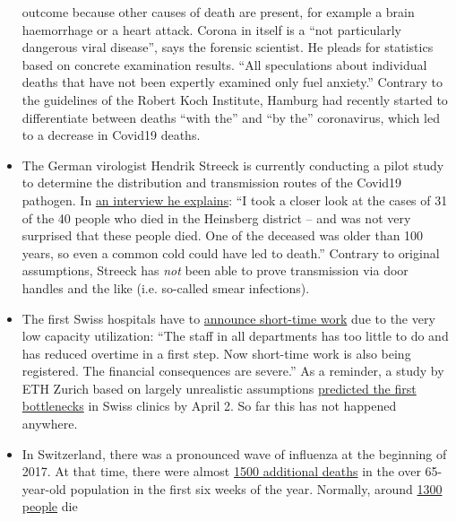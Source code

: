 \begin{itemize}
  outcome because other causes of death are present, for example a brain
  haemorrhage or a heart attack. Corona in itself is a ``not
  particularly dangerous viral disease'', says the forensic scientist.
  He pleads for statistics based on concrete examination results. ``All
  speculations about individual deaths that have not been expertly
  examined only fuel anxiety.'' Contrary to the guidelines of the Robert
  Koch Institute, Hamburg had recently started to differentiate between
  deaths ``with the'' and ``by the'' coronavirus, which led to a
  decrease in Covid19 deaths.
\item
  The German virologist Hendrik Streeck is currently conducting a pilot
  study to determine the distribution and transmission routes of the
  Covid19 pathogen. In
  \href{https://www.zeit.de/wissen/gesundheit/2020-04/hendrik-streeck-covid-19-heinsberg-symptome-infektionsschutz-massnahmen-studie/komplettansicht}{an
  interview he explains}: ``I took a closer look at the cases of 31 of
  the 40 people who died in the Heinsberg district -- and was not very
  surprised that these people died. One of the deceased was older than
  100 years, so even a common cold could have led to death.'' Contrary
  to original assumptions, Streeck has \emph{not} been able to prove
  transmission via door handles and the like (i.e. so-called smear
  infections).
\item
  The first Swiss hospitals have to
  \href{https://www.engadinerpost.ch/2020/4/04/Engadiner-Spitaeler-haben-freie-Kapazitaeten}{announce
  short-time work} due to the very low capacity utilization: ``The staff
  in all departments has too little to do and has reduced overtime in a
  first step. Now short-time work is also being registered. The
  financial consequences are severe.'' As a reminder, a study by ETH
  Zurich based on largely unrealistic assumptions
  \href{https://www.toponline.ch/news/coronavirus/detail/news/studie-bestaetigt-engpass-bei-spitalbetten-steht-kurz-bevor-00131333/}{predicted
  the first bottlenecks} in Swiss clinics by April 2. So far this has
  not happened anywhere.
\item
  In Switzerland, there was a pronounced wave of influenza at the
  beginning of 2017. At that time, there were almost
  \href{https://www.srf.ch/news/schweiz/todesursachen-statistik-woran-die-meisten-schweizerinnen-und-schweizer-sterben}{1500
  additional deaths} in the over 65-year-old population in the first six
  weeks of the year. Normally, around
  \href{https://www.nzz.ch/lungenentzuendung-1.4550285}{1300 people} die

\end{itemize}
